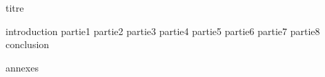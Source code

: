 \documentclass[a4paper,11pt,final]{report}
\begin{document}
  \renewcommand{\contentsname}{Sommaire}  %
   {titre}
  
  \tableofcontents %
  \thispagestyle{fancy}
  \listoffigures
  \thispagestyle{fancy}
   {introduction}
   {partie1}
   {partie2}
   {partie3}
   {partie4}
   {partie5}
   {partie6}
   {partie7}
   {partie8}
   {conclusion}
  
  
   {annexes}
\end{document}
